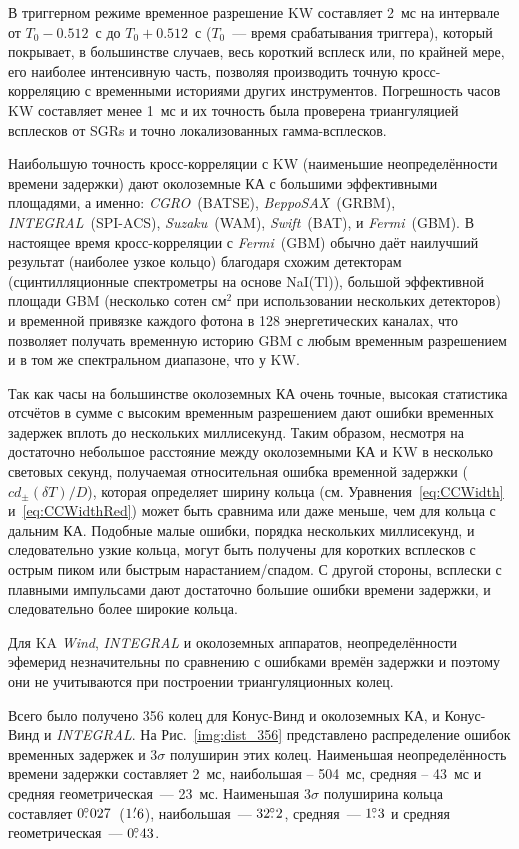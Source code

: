 В триггерном режиме временное разрешение KW составляет 2~мс на интервале 
от $T_0-0.512$~с до $T_0+0.512$~с ($T_0$~--- время срабатывания триггера), 
который покрывает, в большинстве случаев, весь короткий всплеск или, по крайней 
мере, его наиболее интенсивную часть, позволяя производить точную кросс-корреляцию 
с временными историями других инструментов. Погрешность часов KW составляет 
менее 1~мс и их точность была проверена триангуляцией всплесков от SGRs 
и точно локализованных гамма-всплесков.

Наибольшую точность кросс-корреляции с KW (наименьшие неопределённости 
времени задержки) дают околоземные КА с большими эффективными площадями, 
а именно: \textit{CGRO}~(BATSE), \textit{BeppoSAX}~(GRBM), \textit{INTEGRAL}~(SPI-ACS), 
\textit{Suzaku}~(WAM), \textit{Swift}~(BAT), и \textit{Fermi}~(GBM). 
В настоящее время кросс-корреляции с \textit{Fermi}~(GBM) обычно даёт наилучший 
результат (наиболее узкое кольцо) благодаря схожим детекторам (сцинтилляционные 
спектрометры на основе NaI(Tl)), большой эффективной площади GBM 
(несколько сотен см$^2$ при использовании нескольких детекторов) и временной 
привязке каждого фотона в 128 энергетических каналах, что позволяет получать 
временную историю GBM с любым временным разрешением и в том же спектральном диапазоне, 
что у KW.

Так как часы на большинстве околоземных КА очень точные, высокая статистика 
отсчётов в сумме с высоким временным разрешением дают ошибки временных задержек 
вплоть до нескольких миллисекунд. Таким образом, несмотря на достаточно небольшое 
расстояние между околоземными КА и KW в несколько световых секунд, 
получаемая относительная ошибка временной задержки ($c d_{\pm}(\delta T)/D$), 
которая определяет ширину кольца (см. Уравнения~\ref{eq:CCWidth} и~\ref{eq:CCWidthRed}) 
может быть сравнима или даже меньше, чем для кольца с дальним КА. Подобные малые ошибки, 
порядка нескольких миллисекунд, и следовательно узкие кольца, могут быть получены 
для коротких всплесков с острым пиком или быстрым нарастанием/спадом. 
С другой стороны, всплески с плавными импульсами дают достаточно большие ошибки 
времени задержки, и следовательно более широкие кольца.

Для KA \textit{Wind}, \textit{INTEGRAL} и околоземных аппаратов, неопределённости эфемерид 
незначительны по сравнению с ошибками времён задержки и поэтому они не учитываются 
при построении триангуляционных колец.

Всего было получено 356 колец для Конус-Винд и околоземных КА, и Конус-Винд и 
\textit{INTEGRAL}. На Рис.~\ref{img:dist_356} представлено распределение ошибок временных 
задержек и $3\sigma$ полуширин этих колец. Наименьшая неопределённость времени 
задержки составляет 2~мс, наибольшая -- 504~мс, средняя -- 43~мс и средняя 
геометрическая~--- 23~мс. Наименьшая $3\sigma$ полуширина кольца составляет 
$0\mbox{$.\!\!^\circ$}027$~($1\mbox{$.\mkern-4mu^\prime$}6$), наибольшая~--- $32\mbox{$.\!\!^\circ$}2$, 
средняя~--- $1\mbox{$.\!\!^\circ$}3$ и средняя геометрическая~--- $0\mbox{$.\!\!^\circ$}43$.

